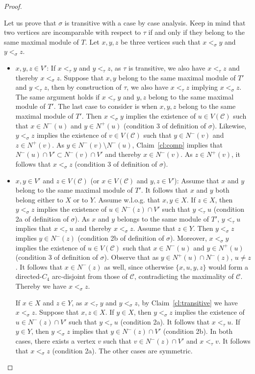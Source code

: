 \begin{proof}
\begin{proofclaim}
Let us prove that $\sigma$ is transitive with a case by case analysis.  Keep in mind that two vertices are incomparable with respect to $\tau$ if and only if they belong to the same maximal module of $T$. Let $x, y, z$ be three vertices such that $x<_{\sigma} y$ and $y<_{\sigma} z$.
\begin{itemize}
\item $x,y,z\in V'$: If $x<_{\tau} y$ and $y<_{\tau} z$, as $\tau$ is transitive, we also have $x<_{\tau} z$ and thereby $x<_{\sigma} z$. Suppose that $x, y$ belong to the same maximal module of $T'$ and $y<_{\tau} z$, then by construction of $\tau$, we also have $x<_{\tau} z$ implying $x<_{\sigma} z$. The same argument holds if  $x<_{\tau} y$ and $y,z$ belong to the same maximal module of $T'$. The last case to consider is when $x,y,z$ belong to the same maximal module of $T'$. Then $x<_{\sigma} y$ implies the existence of $u\in V(\mathcal{C})$ such that $x\in N^-(u)$ and $y\in N^+(u)$ (condition 3 of definition of $\sigma$). Likewise, $y<_{\sigma} z$ implies the existence of $v\in V(\mathcal{C})$ such that $y\in N^-(v)$ and $z\in N^+(v)$. As $y\in N^-(v)\setminus N^-(u)$, Claim~\ref{cl:comp} implies that $N^-(u)\cap V'\subset N^-(v)\cap V'$ and thereby $x\in N^-(v)$. As $z\in N^+(v)$, it follows that $x<_{\sigma} z$ (condition 3 of definition of $\sigma$).


\item $x,y \in V'$ and $z\in V(\mathcal{C})$ (or $x\in V(\mathcal{C})$ and $y,z\in V'$): Assume that $x$ and $y$ belong to the same maximal module of $T'$. 
It follows that $x$ and $y$ both belong either to $X$ or to $Y$. Assume w.l.o.g. that $x,y\in X$.
If $z\in X$, then $y<_{\sigma} z$ implies the existence of $u\in N^-(z)\cap V'$ such that $y<_{\tau} u$ (condition 2a of definition of $\sigma$). As $x$ and $y$ belongs to the same module of $T'$, $y<_{\tau} u$ implies that $x<_{\tau} u$ and thereby $x<_{\sigma} z$. Assume that $z\in Y$. Then $y<_{\sigma} z$ implies $y\in N^-(z)$ (condition 2b of definition of $\sigma$). Moreover, $x <_\sigma y$ implies the existence of $u \in V(\mathcal{C})$ such that $x \in N^-(u)$ and $y \in N^+(u)$ (condition 3 of definition of $\sigma$). Observe that as $y\in N^+(u)\cap N^-(z)$, $u\neq z$. It follows that $x\in N^-(z)$ as well, 
since otherwise $\{x,u,y,z\}$ would form a directed-$C_4$ arc-disjoint from those of $\mathcal{C}$, contradicting the maximality of $\mathcal{C}$. Thereby we have $x<_{\sigma} z$.

If $x\in X$ and $z\in Y$, as $x<_{\tau} y$ and $y<_{\sigma} z$, by Claim~\ref{cl:transitive} we have $x<_{\sigma} z$. Suppose that $x,z\in X$. If $y\in X$, then $y<_{\sigma} z$ implies the existence of $u\in N^-(z)\cap V'$ such that $y<_{\tau} u$ (condition 2a). It follows that $x<_{\tau} u$. If $y\in Y$, then $y<_{\sigma} z$ implies that $y\in N^-(z)\cap V'$ (condition 2b). In both cases, there exists a vertex $v$ such that $v\in N^-(z)\cap V'$ and $x<_{\tau} v$. It follows that $x<_{\sigma} z$ (condition 2a). The other cases are symmetric. 


\end{itemize}
\end{proofclaim}
\end{proof}
